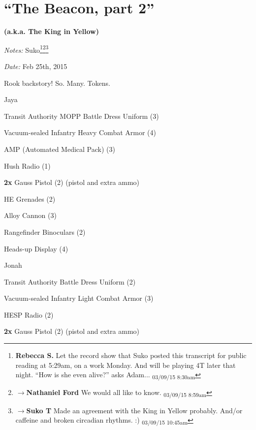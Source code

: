 \setcounter{chapter}{ 40 }
\chapter{\textbf{``The Beacon, part 2''} }




\begin{center}
 {\LARGE \textbf{(a.k.a. The King in Yellow)} } 
\end{center}




\textit{Notes:} Suko\footnote{\textbf{Rebecca S. }Let the record show that Suko posted this transcript for public reading at 5:29am, on a work Monday. And will be playing 4T later that night.  
``How is she even alive?'' asks Adam... \textsubscript{03/09/15 8:30am}}\footnote{$\rightarrow$\textbf{Nathaniel Ford }We would all like to know. \textsubscript{03/09/15 8:59am}}\footnote{$\rightarrow$\textbf{Suko T }Made an agreement with the King in Yellow probably.  And/or caffeine and broken circadian rhythms. :) \textsubscript{03/09/15 10:45am}}

\textit{Date:} Feb 25th, 2015



Rook backstory!  So.  Many.  Tokens.





\noindent\hrulefill





Jaya

Transit Authority MOPP Battle Dress Uniform (3)

Vacuum-sealed Infantry Heavy Combat Armor (4) 

AMP (Automated Medical Pack) (3)

Hush Radio (1)

\textbf{2x} Gauss Pistol (2) (pistol and extra ammo)

HE Grenades (2)

Alloy Cannon (3)

Rangefinder Binoculars (2)

Heads-up Display (4)



Jonah

Transit Authority Battle Dress Uniform (2)

Vacuum-sealed Infantry Light Combat Armor (3)

HESP Radio (2)

\textbf{2x} Gauss Pistol (2) (pistol and extra ammo)

